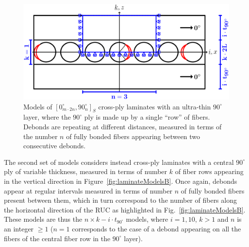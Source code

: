 \documentclass[review]{elsarticle}
\begin{document}
\begin{figure}[!h]
\centering
  \includegraphics[width=\textwidth]{thinPly.pdf}
\caption{Models of $\left[0_{m\cdot2n}^{\circ},90_{n}^{\circ}\right]_{S}$ cross-ply laminates with an ultra-thin $90^{\circ}$ layer, where the $90^{\circ}$ ply is made up by a single ``row'' of fibers. Debonds are repeating at different distances, measured in terms of the number $n$ of fully bonded fibers appearing between two consecutive debonds.}\label{fig:laminateModelsA}
\end{figure}

The second set of models considers instead cross-ply laminates with a central $90^{\circ}$ ply of variable thickness, measured in terms of number $k$ of fiber rows appearing in the vertical direction in Figure~\ref{fig:laminateModelsB}. Once again, debonds appear at regular intervals measured in terms of number $n$ of fully bonded fibers present between them, which in turn correspond to the number of fibers along the horizontal direction of the RUC as highlighted in Fig.~\ref{fig:laminateModelsB}. These models are thus the $n\times k-i\cdot t_{90^{\circ}}$ models, where $i=1,10$, $k>1$ and $n$ is an integer $\geq1$ ($n=1$ corresponds to the case of a debond appearing on all the fibers of the central fiber row in the $90^{\circ}$ layer).
\end{document}
